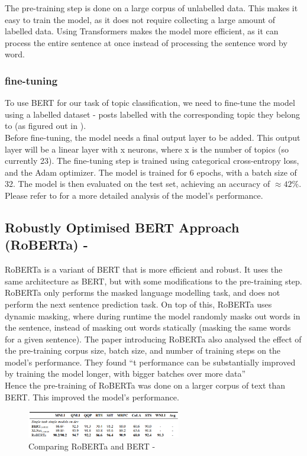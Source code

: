 The pre-training step is done on a large corpus of unlabelled data. This makes it easy to train the model, as it does not require
collecting a large amount of labelled data. Using Transformers makes the model more efficient, as it can process the entire sentence
at once instead of processing the sentence word by word.

\subsubsection{fine-tuning}
To use BERT for our task of topic classification, we need to fine-tune the model using a labelled dataset - posts labelled with the
corresponding topic they belong to (as figured out in ).\\
Before fine-tuning, the model needs a final output layer to be added. This output layer will be a linear layer with x neurons, where
x is the number of topics (so currently 23). The fine-tuning step is trained using categorical cross-entropy loss, and the Adam optimizer.
The model is trained for 6 epochs, with a batch size of 32. The model is then evaluated on the test set, achieving an accuracy
of $\approx 42\%$. Please refer to  for a more detailed analysis of the model's performance.

\subsection{Robustly Optimised BERT Approach (RoBERTa) - \cite{DBLP:journals/corr/abs-1907-11692}}
RoBERTa is a variant of BERT that is more efficient and robust. It uses the same architecture as BERT, but with some modifications to 
the pre-training step. RoBERTa only performs the masked language modelling task, and does not perform the next sentence prediction task.
On top of this, RoBERTa uses dynamic masking, where during runtime the model randomly masks out words in the sentence, instead of
masking out words statically (masking the same words for a given sentence). The paper introducing RoBERTa also analysed the effect
of the pre-training corpus size, batch size, and number of training steps on the model's performance. They found ``t performance can be substantially
improved by training the model longer, with bigger batches over more data'' \cite{DBLP:journals/corr/abs-1907-11692}\\
Hence the pre-training of RoBERTa was done on a larger corpus of text than BERT. This improved the model's performance.
\begin{figure}[hbtp]
    \centering
    \includegraphics[width=0.6\textwidth]{../images/roberta-tasks.png}
    \caption{Comparing RoBERTa and BERT - \cite{DBLP:journals/corr/abs-1907-11692}}
    \label{fig:bertcomproberta}
\end{figure}

